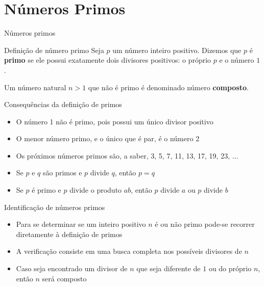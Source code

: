 \section{Números Primos}

\begin{frame}[fragile]{Números primos}

    \begin{block}{Definição de número primo}
    Seja $p$ um número inteiro positivo. Dizemos que $p$ é \textbf{primo} se ele possui exatamente 
    dois divisores positivos: o próprio $p$ e o número $1$.

    Um número natural $n > 1$ que não é primo é denominado número \textbf{composto}. 
    \end{block}

\end{frame}


\begin{frame}[fragile]{Consequências da definição de primos}

    \begin{itemize}
        \item O número 1 não é primo, pois possui um único divisor positivo

        \item O menor número primo, e o único que é par, é o número 2

        \item Os próximos números primos são, a saber, 3, 5, 7, 11, 13, 17, 19, 23, $\ldots$

        \item Se $p$ e $q$ são primos e $p$ divide $q$, então $p = q$

        \item Se $p$ é primo e $p$ divide o produto $ab$, então $p$ divide $a$ ou $p$ divide $b$ 

    \end{itemize}

\end{frame}

\begin{frame}[fragile]{Identificação de números primos}

    \begin{itemize}
        \item Para se determinar se um inteiro positivo $n$ é ou não primo pode-se recorrer 
            diretamente à definição de primos 

        \item A verificação consiste em uma busca completa nos possíveis divisores de $n$

        \item Caso seja encontrado um divisor de $n$ que seja diferente de $1$ ou do próprio $n$, 
            então $n$ será composto
    \end{itemize}

\end{frame}

